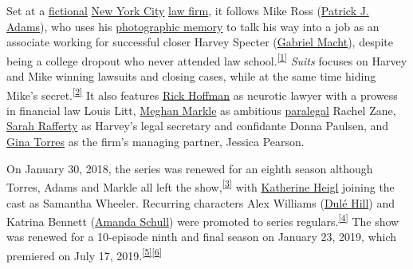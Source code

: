 \documentclass[
  letterpaper,
  DIV=11,
  numbers=noendperiod]{scrartcl}
\begin{document}
Set at a \href{https://en.wikipedia.org/wiki/Fictional}{fictional}
\href{https://en.wikipedia.org/wiki/New_York_City}{New York City}
\href{https://en.wikipedia.org/wiki/Law_firm}{law firm}, it follows Mike
Ross (\href{https://en.wikipedia.org/wiki/Patrick_J._Adams}{Patrick J.
Adams}), who uses his
\href{https://en.wikipedia.org/wiki/Photographic_memory}{photographic
memory} to talk his way into a job as an associate working for
successful closer Harvey Specter
(\href{https://en.wikipedia.org/wiki/Gabriel_Macht}{Gabriel Macht}),
despite being a college dropout who never attended law
school.\textsuperscript{\href{https://en.wikipedia.org/wiki/Suits_(American_TV_series)\#cite_note-SuitsSeriesPremiere-2}{{[}1{]}}}
\emph{Suits} focuses on Harvey and Mike winning lawsuits and closing
cases, while at the same time hiding Mike's
secret.\textsuperscript{\href{https://en.wikipedia.org/wiki/Suits_(American_TV_series)\#cite_note-3}{{[}2{]}}}
It also features \href{https://en.wikipedia.org/wiki/Rick_Hoffman}{Rick
Hoffman} as neurotic lawyer with a prowess in financial law Louis Litt,
\href{https://en.wikipedia.org/wiki/Meghan_Markle}{Meghan Markle} as
ambitious \href{https://en.wikipedia.org/wiki/Paralegal}{paralegal}
Rachel Zane, \href{https://en.wikipedia.org/wiki/Sarah_Rafferty}{Sarah
Rafferty} as Harvey's legal secretary and confidante Donna Paulsen, and
\href{https://en.wikipedia.org/wiki/Gina_Torres}{Gina Torres} as the
firm's managing partner, Jessica Pearson.

On January 30, 2018, the series was renewed for an eighth season
although Torres, Adams and Markle all left the
show,\textsuperscript{\href{https://en.wikipedia.org/wiki/Suits_(American_TV_series)\#cite_note-4}{{[}3{]}}}
with \href{https://en.wikipedia.org/wiki/Katherine_Heigl}{Katherine
Heigl} joining the cast as Samantha Wheeler. Recurring characters Alex
Williams (\href{https://en.wikipedia.org/wiki/Dul\%C3\%A9_Hill}{Dulé
Hill}) and Katrina Bennett
(\href{https://en.wikipedia.org/wiki/Amanda_Schull}{Amanda Schull}) were
promoted to series
regulars.\textsuperscript{\href{https://en.wikipedia.org/wiki/Suits_(American_TV_series)\#cite_note-S8-Heigl-5}{{[}4{]}}}
The show was renewed for a 10-episode ninth and final season on January
23, 2019, which premiered on July 17,
2019.\textsuperscript{\href{https://en.wikipedia.org/wiki/Suits_(American_TV_series)\#cite_note-6}{{[}5{]}}\href{https://en.wikipedia.org/wiki/Suits_(American_TV_series)\#cite_note-7}{{[}6{]}}}
\end{document}

